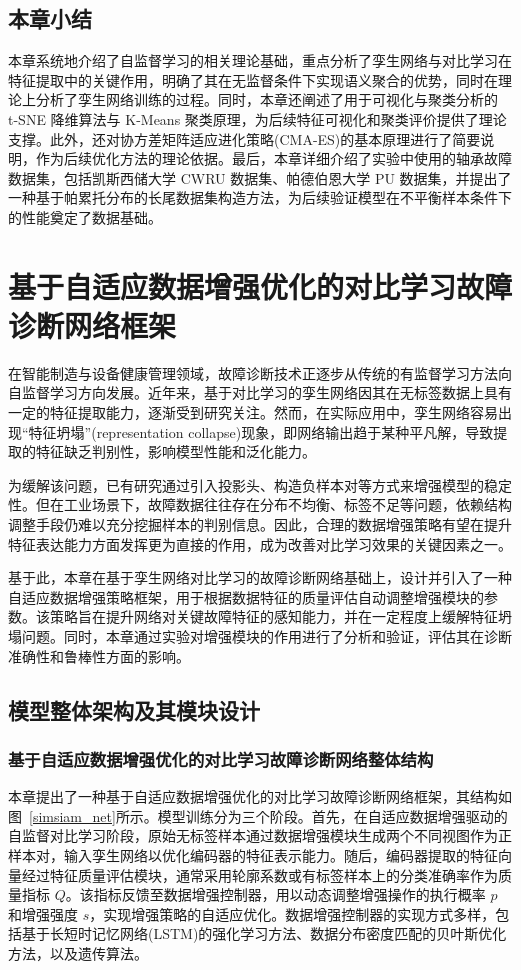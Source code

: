 \documentclass[master]{thesis-uestc}
\begin{document}
\section{本章小结}
本章系统地介绍了自监督学习的相关理论基础，重点分析了孪生网络与对比学习在特征提取中的关键作用，明确了其在无监督条件下实现语义聚合的优势，同时在理论上分析了孪生网络训练的过程。同时，本章还阐述了用于可视化与聚类分析的 t-SNE 降维算法与 K-Means 聚类原理，为后续特征可视化和聚类评价提供了理论支撑。此外，还对协方差矩阵适应进化策略(CMA-ES)的基本原理进行了简要说明，作为后续优化方法的理论依据。最后，本章详细介绍了实验中使用的轴承故障数据集，包括凯斯西储大学 CWRU 数据集、帕德伯恩大学 PU 数据集，并提出了一种基于帕累托分布的长尾数据集构造方法，为后续验证模型在不平衡样本条件下的性能奠定了数据基础。

\chapter{基于自适应数据增强优化的对比学习故障诊断网络框架}
在智能制造与设备健康管理领域，故障诊断技术正逐步从传统的有监督学习方法向自监督学习方向发展。近年来，基于对比学习的孪生网络因其在无标签数据上具有一定的特征提取能力，逐渐受到研究关注。然而，在实际应用中，孪生网络容易出现“特征坍塌”(representation collapse)现象，即网络输出趋于某种平凡解，导致提取的特征缺乏判别性，影响模型性能和泛化能力。

为缓解该问题，已有研究通过引入投影头、构造负样本对等方式来增强模型的稳定性。但在工业场景下，故障数据往往存在分布不均衡、标签不足等问题，依赖结构调整手段仍难以充分挖掘样本的判别信息。因此，合理的数据增强策略有望在提升特征表达能力方面发挥更为直接的作用，成为改善对比学习效果的关键因素之一。

基于此，本章在基于孪生网络对比学习的故障诊断网络基础上，设计并引入了一种自适应数据增强策略框架，用于根据数据特征的质量评估自动调整增强模块的参数。该策略旨在提升网络对关键故障特征的感知能力，并在一定程度上缓解特征坍塌问题。同时，本章通过实验对增强模块的作用进行了分析和验证，评估其在诊断准确性和鲁棒性方面的影响。

\section{模型整体架构及其模块设计}
\subsection{基于自适应数据增强优化的对比学习故障诊断网络整体结构}

本章提出了一种基于自适应数据增强优化的对比学习故障诊断网络框架，其结构如图~\ref{simsiam_net}所示。模型训练分为三个阶段。首先，在自适应数据增强驱动的自监督对比学习阶段，原始无标签样本通过数据增强模块生成两个不同视图作为正样本对，输入孪生网络以优化编码器的特征表示能力。随后，编码器提取的特征向量经过特征质量评估模块，通常采用轮廓系数或有标签样本上的分类准确率作为质量指标 \(Q\)。该指标反馈至数据增强控制器，用以动态调整增强操作的执行概率 \(p\) 和增强强度 \(s\)，实现增强策略的自适应优化。数据增强控制器的实现方式多样，包括基于长短时记忆网络(LSTM)的强化学习方法、数据分布密度匹配的贝叶斯优化方法，以及遗传算法。
\end{document}

